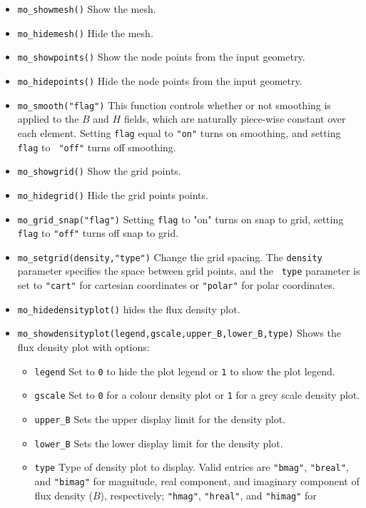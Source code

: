 \begin{itemize}
\item{\verb+mo_showmesh()+} Show the mesh.
\item{\verb+mo_hidemesh()+} Hide the mesh.
\item{\verb+mo_showpoints()+} Show the node points from the input geometry.
\item{\verb+mo_hidepoints()+} Hide the node points from the input geometry.
\item{\tt mo\_smooth("flag")} This function controls whether or not smoothing
is applied to the $B$ and $H$ fields, which are naturally
piece-wise constant over each element.  Setting {\tt flag} equal to
{\tt "on"} turns on smoothing, and setting {\tt flag} to {\tt
"off"} turns off smoothing.
\item{\verb+mo_showgrid()+} Show the grid points.
\item{\verb+mo_hidegrid()+} Hide the grid points points.
\item{\verb+mo_grid_snap("flag")+}
Setting {\tt flag} to "on" turns on snap to grid, setting {\tt
flag} to {\tt "off"} turns off snap to grid.
\item{\verb+mo_setgrid(density,"type")+} Change the grid spacing.  The {\tt density}
parameter specifies the space between grid points, and the {\tt
type} parameter is set to {\tt "cart"} for cartesian coordinates or
{\tt "polar"} for polar coordinates.
\item{\verb+mo_hidedensityplot()+} hides the flux density plot.
\item{\verb+mo_showdensityplot(legend,gscale,upper_B,lower_B,type)+}
Shows the flux density plot with options:
        \begin{itemize}
        \item {\tt legend} Set to {\tt 0} to hide the plot legend or {\tt 1} to show the plot
        legend.
        \item {\tt gscale} Set to {\tt 0} for a colour density plot or {\tt 1} for a grey scale density
        plot.
        \item{\verb+upper_B+} Sets the upper display limit for the density
        plot.
        \item{\verb+lower_B+} Sets the lower display limit for the density
        plot.
        \item{\tt type} Type of density plot to display. Valid
        entries are {\tt "bmag"}, {\tt "breal"}, and {\tt "bimag"} for
        magnitude, real component, and imaginary component of flux density ($B$),
        respectively; {\tt "hmag"}, {\tt "hreal"}, and {\tt "himag"} for

\end{itemize}
\end{itemize}
